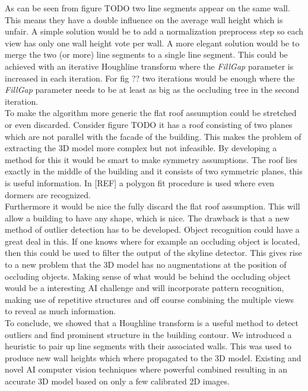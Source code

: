 \documentclass[10pt]{article}
\begin{document}
As can be seen from figure TODO%
two line segments appear on the same wall. This means they have a double influence on the average wall height which is unfair. A simple solution would be to add a normalization preprocess step so each view has only one wall height vote per wall. A more elegant solution would be to merge the two (or more) line segments to a single line segment. This could be achieved with an iterative Houghline transform where the \emph{FillGap} parameter is increased in each iteration. For fig ?? %
two iterations would be enough where the \emph{FillGap} parameter needs to be at least as big as the occluding tree in the second iteration.\\
To make the algorithm more generic the flat roof assumption could be stretched or even discarded.
Consider figure TODO %
it has a roof consisting of two planes which are not parallel with the facade of the building. This makes the problem of extracting the 3D model more complex but not 
infeasible. By developing a method for this it would be smart to make symmetry assumptions. The roof lies exactly in the middle of the building and it consists of two symmetric planes, this is useful information. In 
[REF] a polygon fit procedure is used where even dormers are recognized.\\

Furthermore it would be nice the fully discard the flat roof assumption. This will allow a building to have any shape, which is nice. The drawback is that a new method of outlier detection has to be developed. Object recognition could have a great deal in this. If one knows where for example an occluding object is located, then this could be used to filter the output of the skyline detector. This gives rise to a new problem that the 3D model has no augmentations at the position of occluding objects. Making sense of what would be behind the occluding object would be a interesting AI challenge and will incorporate pattern recognition, making use of repetitive structures and off course combining the multiple views to reveal as much information.\\

To conclude, we showed that a Houghline transform is a useful method to detect outliers and find prominent structure in the building contour. We introduced a heuristic to pair up line segments with their associated walls. This was used to produce new wall heights which where propagated to the 3D model.
Existing and novel AI computer vision techniques where powerful combined resulting in an accurate 3D model based on only a few calibrated 2D images. 


\end{document}
